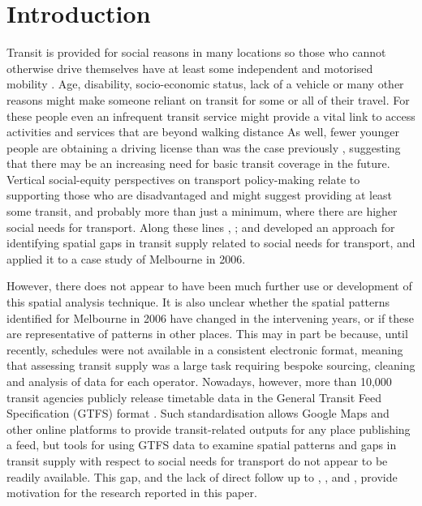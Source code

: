 \documentclass[preprint, 3p,
authoryear]{elsarticle} %
\begin{document}
\section{Introduction}\label{introduction}

Transit is provided for social reasons in many locations so those who
cannot otherwise drive themselves have at least some independent and
motorised mobility \citep{Currie:2016aa}. Age, disability,
socio-economic status, lack of a vehicle or many other reasons might
make someone reliant on transit for some or all of their travel. For
these people even an infrequent transit service might provide a vital
link to access activities and services that are beyond walking distance
As well, fewer younger people are obtaining a driving license than was
the case previously \citep{delbosc2013causes}, suggesting that there may
be an increasing need for basic transit coverage in the future. Vertical
social-equity perspectives on transport policy-making relate to
supporting those who are disadvantaged \citep{Litman:2016aa} and might
suggest providing at least some transit, and probably more than just a
minimum, where there are higher social needs for transport. Along these
lines \citet{Currie2003Hobart}, \citet{Currie2004Gap};
\citet{Currie2007Identifying} and \citet{currie2010identifying}
developed an approach for identifying spatial gaps in transit supply
related to social needs for transport, and applied it to a case study of
Melbourne in 2006.

However, there does not appear to have been much further use or
development of this spatial analysis technique. It is also unclear
whether the spatial patterns identified for Melbourne in 2006 have
changed in the intervening years, or if these are representative of
patterns in other places. This may in part be because, until recently,
schedules were not available in a consistent electronic format, meaning
that assessing transit supply was a large task requiring bespoke
sourcing, cleaning and analysis of data for each operator. Nowadays,
however, more than 10,000 transit agencies publicly release timetable
data in the General Transit Feed Specification (GTFS) format
\citep{GTFS}. Such standardisation allows Google Maps and other online
platforms to provide transit-related outputs for any place publishing a
feed, but tools for using GTFS data to examine spatial patterns and gaps
in transit supply with respect to social needs for transport do not
appear to be readily available. This gap, and the lack of direct follow
up to \citet{Currie2003Hobart}, \citet{Currie2004Gap},
\citet{Currie2007Identifying} and \citet{currie2010identifying}, provide
motivation for the research reported in this paper.
\end{document}
